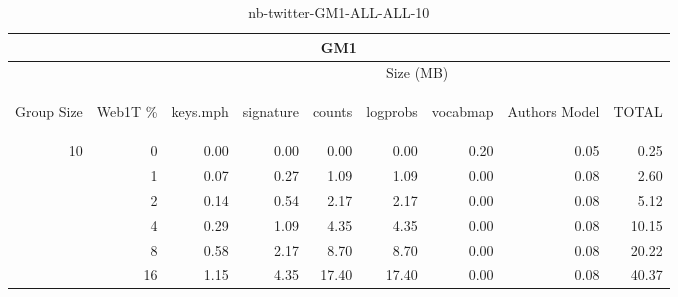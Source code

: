 \begin{center}
\begin{table}[htbp]
\begin{tabular}{ | r | r | r | r | r | r | r | r | r |}
\hline
\multicolumn{9}{|c|}{GM1}\\
\hline
 & & \multicolumn{7}{|c|}{Size (MB)}\\ \cline{3-9}
\begin{sideways}Group Size\end{sideways} & \begin{sideways}Web1T \% \end{sideways} & \begin{sideways}keys.mph\end{sideways} & \begin{sideways}signature\end{sideways} & \begin{sideways}counts\end{sideways} & \begin{sideways}logprobs\end{sideways} & \begin{sideways}vocabmap\end{sideways} & \begin{sideways}Authors Model \end{sideways} & \begin{sideways}TOTAL\end{sideways}\\
\hline
\multirow{5}{*}{10}
 & 0 & 0.00 & 0.00 & 0.00 & 0.00 & 0.20 & 0.05 & 0.25\\ \cline{2-9}
 & 1 & 0.07 & 0.27 & 1.09 & 1.09 & 0.00 & 0.08 & 2.60\\ \cline{2-9}
 & 2 & 0.14 & 0.54 & 2.17 & 2.17 & 0.00 & 0.08 & 5.12\\ \cline{2-9}
 & 4 & 0.29 & 1.09 & 4.35 & 4.35 & 0.00 & 0.08 & 10.15\\ \cline{2-9}
 & 8 & 0.58 & 2.17 & 8.70 & 8.70 & 0.00 & 0.08 & 20.22\\ \cline{2-9}
 & 16 & 1.15 & 4.35 & 17.40 & 17.40 & 0.00 & 0.08 & 40.37\\ \cline{2-9}
\hline
\end{tabular}
\caption{nb-twitter-GM1-ALL-ALL-10}
\label{table:nb-twitter-GM1-ALL-ALL-10}
\end{table}
\end{center}

